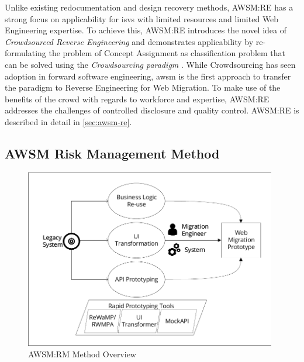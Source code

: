 Unlike existing redocumentation and design recovery methods, AWSM:RE has a strong focus on applicability for \glspl{isv} with limited resources and limited \gls{Web Engineering} expertise.
To achieve this, AWSM:RE introduces the novel idea of \emph{Crowdsourced \gls{Reverse Engineering}} \autocite{Heil2018CSRE} and demonstrates applicability by re-formulating the problem of \gls{Concept Assignment} \autocite{Biggerstaff1994ConceptAssignmentJournal} as classification problem that can be solved using the \emph{\gls{Crowdsourcing} paradigm} \autocite{Howe2006}.
While \gls{Crowdsourcing} has seen adoption in forward software engineering, \gls{awsm} is the first approach to transfer the paradigm to \gls{Reverse Engineering} for \gls{Web Migration}.
To make use of the benefits of the crowd with regards to workforce and expertise, AWSM:RE addresses the challenges of controlled disclosure and quality control.
AWSM:RE is described in detail in \cref{sec:awsm-re}.

\vspace{-10pt}
\hypertarget{awsm-risk-management-method}{%
\subsection{AWSM Risk Management Method}\label{awsm-risk-management-method}}
\vspace{10pt}

\begin{figure}[h!]
\hypertarget{fig:solution-rm}{%
\centering
\includegraphics[width=0.98\textwidth]{../figures/solution-rm.pdf}
\caption{AWSM:RM Method Overview}\label{fig:solution-rm}
}
\end{figure}

